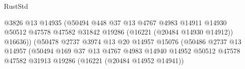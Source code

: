 \begin{lexlean}{RustStd}
\begin{coremodule}
                                                    @3826
                                                    @13
                                                    @14935
                                                    (@50494
                                                      @448
                                                      @37
                                                      @13
                                                      @4767
                                                      @4983
                                                      @14911
                                                      @14930
                                                      @50512
                                                      @47578
                                                      @47582
                                                      @31842
                                                      @19286
                                                      (@16221 (@20484 @14930 @14912))
                                                      @16636))
                                                  (@50478
                                                    @2737
                                                    @3974
                                                    @13
                                                    @20
                                                    @14957
                                                    @15076
                                                    (@50486
                                                      @2737
                                                      @13
                                                      @14957
                                                      (@50494
                                                        @169
                                                        @37
                                                        @13
                                                        @4767
                                                        @4983
                                                        @14940
                                                        @14952
                                                        @50512
                                                        @47578
                                                        @47582
                                                        @31913
                                                        @19286
                                                        (@16221 (@20484 @14952 @14941))

\end{coremodule}
\end{lexlean}
